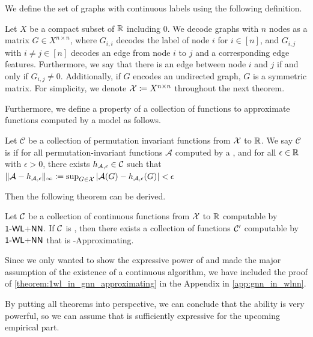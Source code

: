 We define the set of graphs with continuous labels using the following definition.
\begin{definition}
    Let $X$ be a compact subset of $\mathbb{R}$ including $0$. We decode graphs with $n$ nodes as a matrix $G \in X^{n \times n}$, where $G_{i,i}$ decodes the label of node $i$ for $i \in [n]$, and $G_{i,j}$ with $i \neq j \in [n]$ decodes an edge from node $i$ to $j$ and a corresponding edge features. Furthermore, we say that there is an edge between node $i$ and $j$ if and only if $G_{i,j} \neq 0$. Additionally, if $G$ encodes an undirected graph, $G$ is a symmetric matrix. For simplicity, we denote $\mathcal{X} \coloneqq X^{n \times n}$ throughout the next theorem.
\end{definition}

Furthermore, we define a property of a collection of functions to approximate functions computed by a \gnn model as follows.
\begin{definition}[\gapp]
    Let $\mathcal{C}$ be a collection of permutation invariant functions from $\mathcal{X}$ to $\mathbb{R}$. We say $\mathcal{C}$ is \textbf{\gapp} if for all permutation-invariant functions $\mathcal{A}$ computed by a \gnn, and for all $\epsilon \in \mathbb{R}$ with $\epsilon > 0$, there exists $h_{\mathcal{A},\epsilon} \in \mathcal{C}$ such that $\| \mathcal{A} - h_{\mathcal{A},\epsilon} \|_\infty \coloneqq \sup_{G \in \mathcal{X}} |\mathcal{A}(G) - h_{\mathcal{A},\epsilon}(G)| < \epsilon$
\end{definition}

Then the following theorem can be derived.

\begin{theorem}\label{theorem:1wl_in_gnn_approximating}
    Let $\mathcal{C}$ be a collection of continuous functions from $\mathcal{X}$ to $\mathbb{R}$ computable by $\textsf{1-WL+NN}$. If $\mathcal{C}$ is \wldisc, then there exists a collection of functions $\mathcal{C}'$ computable by $\textsf{1-WL+NN}$ that is \gnn-Approximating.
\end{theorem}

Since we only wanted to show the expressive power of \wldisc and made the major assumption of the existence of a continuous \wl algorithm, we have included the proof of \cref{theorem:1wl_in_gnn_approximating} in the Appendix in \autoref{app:gnn_in_wlnn}.

By putting all theorems into perspective, we can conclude that the ability \wldisc is very powerful, so we can assume that \wlnn is sufficiently expressive for the upcoming empirical part.

